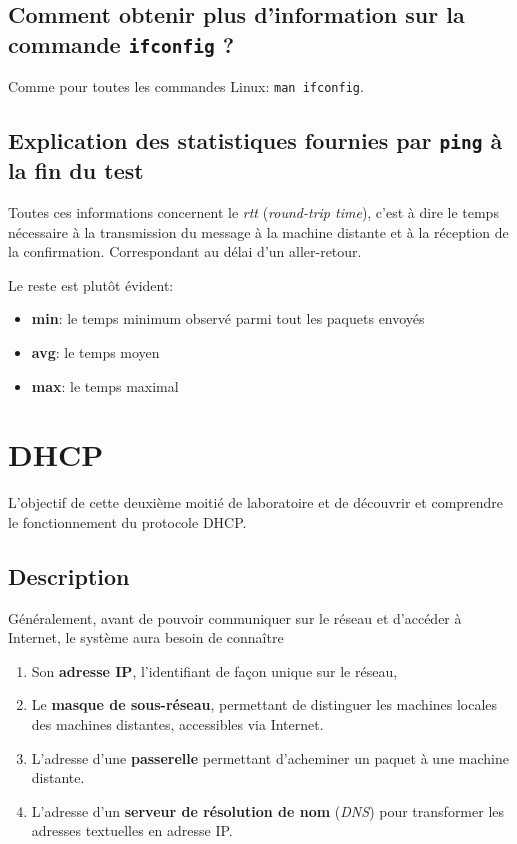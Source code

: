 \documentclass[11pt,a4paper]{article}
\begin{document}
\subsection{Comment obtenir plus d'information sur la commande \texttt{ifconfig} ?}

Comme pour toutes les commandes Linux: \texttt{man ifconfig}.

\subsection{Explication des statistiques fournies par \texttt{ping} à la fin du test}

Toutes ces informations concernent le \textit{rtt} (\textit{round-trip time}), c'est à dire le temps nécessaire à la transmission du message à la machine distante et à la réception de la confirmation. Correspondant au délai d'un aller-retour.

Le reste est plutôt évident:

\begin{itemize}
	\item \textbf{min}: le temps minimum observé parmi tout les paquets envoyés
	\item \textbf{avg}: le temps moyen
	\item \textbf{max}: le temps maximal
\end{itemize}
\pagebreak

\section{DHCP}

L'objectif de cette deuxième moitié de laboratoire et de découvrir et comprendre le fonctionnement du protocole DHCP.

\subsection{Description}



Généralement, avant de pouvoir communiquer sur le réseau et d'accéder à Internet, le système aura besoin de connaître

\begin{enumerate}
	\item Son \textbf{adresse IP}, l'identifiant de façon unique sur le réseau,
	\item Le \textbf{masque de sous-réseau}, permettant de distinguer les machines locales des machines distantes, accessibles via Internet.
	\item L'adresse d'une \textbf{passerelle} permettant d'acheminer un paquet à une machine distante.
	\item L'adresse d'un \textbf{serveur de résolution de nom} (\textit{DNS}) pour transformer les adresses textuelles en adresse IP.
\end{enumerate}
\end{document}
